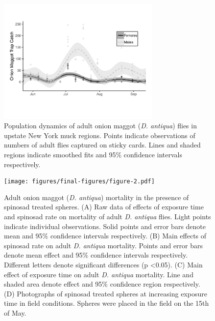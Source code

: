\documentclass[alpha-refs]{wiley-article}
\begin{document}
\begin{figure}[bt]
\centering
\includegraphics[width = 8cm]{figures/final-figures/figure-1.pdf}
\caption{Population dynamics of adult onion maggot (\textit{D. antiqua}) flies in upstate New York muck regions.  Points indicate observations of numbers of adult flies captured on sticky cards.  Lines and shaded regions indicate smoothed fits and 95\% confidence intervals respectively.  }
\label{fig:figure1}
\end{figure}

\begin{figure}[bt]
\centering
\texttt{[image: figures/final-figures/figure-2.pdf]}
\caption{Adult onion maggot (\textit{D. antiqua}) mortality in the presence of spinosad treated spheres.  (A) Raw data of effects of exposure time and spinosad rate on mortality of adult \textit{D. antiqua} flies.  Light points indicate individual observations.  Solid points and error bars denote mean and 95\% confidence intervals respectively.  (B) Main effects of spinosad rate on adult \textit{D. antiqua} mortality.  Points and error bars denote mean effect and 95\% confidence intervals respectively.  Different letters denote significant differences (p \textless 0.05).  (C) Main effect of exposure time on adult \textit{D. antiqua} mortality.  Line and shaded area denote effect and 95\% confidence region respectively.  (D) Photographs of spinosad treated spheres at increasing exposure time in field conditions.  Spheres were placed in the field on the 15th of May.  }
\label{fig:figure2}
\end{figure}
\end{document}
